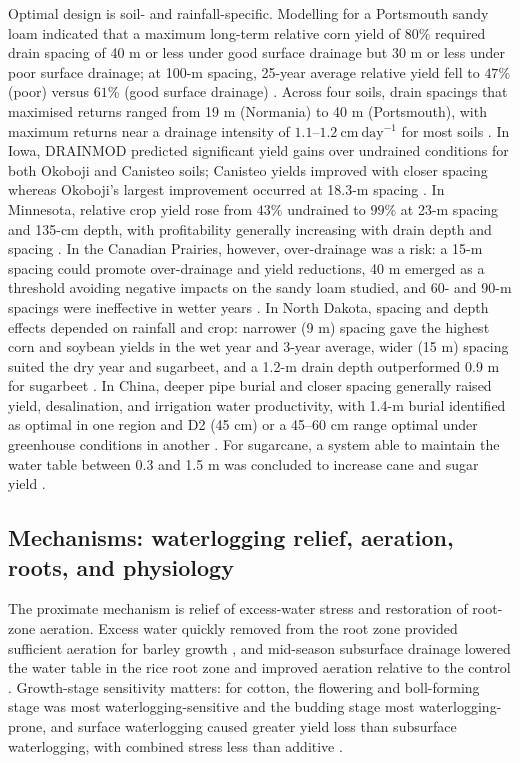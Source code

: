 Optimal design is soil- and rainfall-specific. Modelling for a Portsmouth sandy loam indicated that a maximum long-term relative corn yield of \(80\%\) required drain spacing of 40 m or less under good surface drainage but 30 m or less under poor surface drainage; at 100-m spacing, 25-year average relative yield fell to \(47\%\) (poor) versus \(61\%\) (good surface drainage) \parencite{HARDJOAMIDJOJO1982}. Across four soils, drain spacings that maximised returns ranged from 19 m (Normania) to 40 m (Portsmouth), with maximum returns near a drainage intensity of \(1.1\textrm{--}1.2\ \mathrm{cm\ day^{-1}}\) for most soils \parencite{Skaggs2006}. In Iowa, DRAINMOD predicted significant yield gains over undrained conditions for both Okoboji and Canisteo soils; Canisteo yields improved with closer spacing whereas Okoboji's largest improvement occurred at 18.3-m spacing \parencite{Arora2024}. In Minnesota, relative crop yield rose from \(43\%\) undrained to \(99\%\) at 23-m spacing and 135-cm depth, with profitability generally increasing with drain depth and spacing \parencite{Sands2015}. In the Canadian Prairies, however, over-drainage was a risk: a 15-m spacing could promote over-drainage and yield reductions, 40 m emerged as a threshold avoiding negative impacts on the sandy loam studied, and 60- and 90-m spacings were ineffective in wetter years \parencite{Cordeiro2015}. In North Dakota, spacing and depth effects depended on rainfall and crop: narrower (9 m) spacing gave the highest corn and soybean yields in the wet year and 3-year average, wider (15 m) spacing suited the dry year and sugarbeet, and a 1.2-m drain depth outperformed 0.9 m for sugarbeet \parencite{Acharya2019}. In China, deeper pipe burial and closer spacing generally raised yield, desalination, and irrigation water productivity, with 1.4-m burial identified as optimal in one region and D2 (45 cm) or a 45--60 cm range optimal under greenhouse conditions in another \parencite{Liu2025,Yang2022,Guo2025,Hou2018}. For sugarcane, a system able to maintain the water table between 0.3 and 1.5 m was concluded to increase cane and sugar yield \parencite{CAMP1982}.

\subsection{Mechanisms: waterlogging relief, aeration, roots, and physiology}

The proximate mechanism is relief of excess-water stress and restoration of root-zone aeration. Excess water quickly removed from the root zone provided sufficient aeration for barley growth \parencite{BENNETT1982}, and mid-season subsurface drainage lowered the water table in the rice root zone and improved aeration relative to the control \parencite{DarziNaftchali2014}. Growth-stage sensitivity matters: for cotton, the flowering and boll-forming stage was most waterlogging-sensitive and the budding stage most waterlogging-prone, and surface waterlogging caused greater yield loss than subsurface waterlogging, with combined stress less than additive \parencite{Qian2021}.

